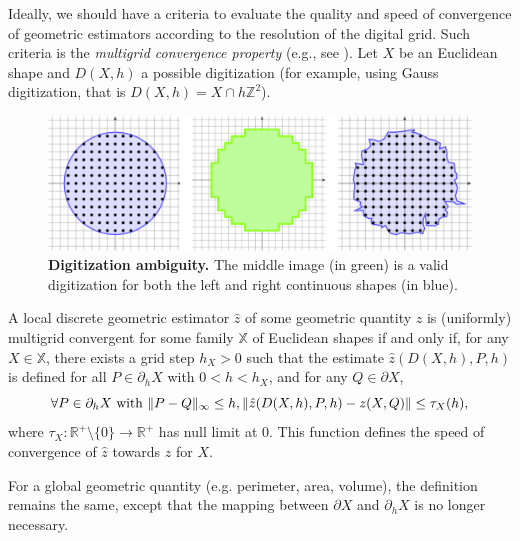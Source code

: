 \documentclass[smallextended]{svjour3}
\DeclarePairedDelimiter\norm{\lVert}{\rVert}%
\begin{document}
Ideally, we should have a criteria to evaluate the quality and speed
of convergence of geometric estimators according to the resolution of
the digital grid. Such criteria is the \emph{multigrid convergence
property} (e.g., see \cite{klette2004digital}). Let $X$ be an Euclidean
shape and $D(X,h)$ a possible digitization (for example, using Gauss
digitization, that is $D(X,h) = X \cap h\mathbb{Z}^2$).
%
%
\begin{figure}
\center
\includegraphics[scale=1]{figures/ambiguity.png}
\caption{\textbf{Digitization ambiguity.} The middle image (in green) is a valid digitization for both the left and right continuous shapes (in blue).}
\label{fig:digitization-ambiguity}
\end{figure}
%
%
\begin{definition}
  A local discrete geometric estimator $\hat{z}$ of some geometric
  quantity $z$ is (uniformly) multigrid convergent for some family $\mathbb{X}$ of Euclidean shapes if
  and only if, for any $X \in \mathbb{X}$, there exists a grid step
  $h_X>0$ such that the estimate $\hat{z}(D(X,h), P,h)$ is
  defined for all $P \in \partial_hX$ with $ 0 < h < h_X$, and
  for any $Q \in \partial X$,
  \begin{equation*}
    \forall P \in  \partial_hX \text{ with } \norm{ P - Q }_{\infty} \leq h, \norm{ \hat{z}(D(X,h),P,h) - z(X,Q)} \leq \tau_{X}(h),			
  \end{equation*}
  where $\tau_{X}:\mathbb{R}^{+}\setminus\{0\} \rightarrow
  \mathbb{R}^{+}$ has null limit at $0$. This function defines the
  speed of convergence of $\hat{z}$ towards $z$ for $X$.
\end{definition}
	
For a global geometric quantity (e.g. perimeter, area, volume), the definition remains the same, except that the mapping
between $\partial X$ and $\partial_h X$ is no longer necessary.
\end{document}
